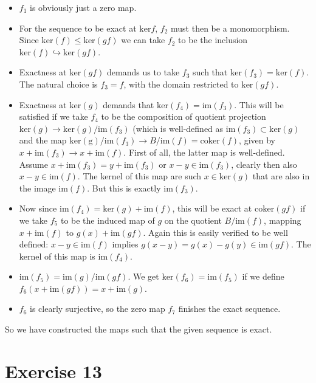 \documentclass{article}
\begin{document}
\begin{itemize}
\item $f_1$ is obviously just a zero map. 
\item For the sequence to be exact at $\mathrm{ker} f$, $f_2$ must then be a monomorphism. 
Since $\mathrm{ker}(f) \leq \mathrm{ker}(gf)$ we can take $f_2$ to be the inclusion $\mathrm{ker}(f) \hookrightarrow \mathrm{ker}(gf)$. 
\item Exactness at $\mathrm{ker}(gf)$ demands us to take $f_3$ such that $\mathrm{ker}(f_3) = \mathrm{ker}(f)$. The natural choice is $f_3=f$, with the domain restricted to $\mathrm{ker}(gf)$.
\item Exactness at $\mathrm{ker}(g)$ demands that $\mathrm{ker}(f_4) = \mathrm{im}(f_3)$. This will be satisfied if we take $f_4$ to be the composition of quotient projection $\mathrm{ker}(g) \to \mathrm{ker}(g)/\mathrm{im}(f_3)$ (which is well-defined as $\mathrm{im}(f_3) \subset \mathrm{ker}(g)$ and the map $\mathrm{ker(g)}/\mathrm{im}(f_3) \to B/\mathrm{im}(f) = \mathrm{coker}(f)$, given by $x + \mathrm{im}(f_3) \to x + \mathrm{im}(f)$.
First of all, the latter map is well-defined. Assume $x+\mathrm{im}(f_3) = y+\mathrm{im}(f_3)$ or $x-y \in \mathrm{im}(f_3)$, clearly then also $x-y \in \mathrm{im}(f)$. The kernel of this map are such $x \in \mathrm{ker}(g)$ that are also in the image $\mathrm{im}(f)$. But this is exactly $\mathrm{im}(f_3)$.
\item Now since $\mathrm{im}(f_4) = \mathrm{ker}(g) + \mathrm{im}(f)$, this will be exact at $\mathrm{coker}(gf)$ if we take $f_5$ to be the induced map of $g$ on the quotient $B/\mathrm{im}(f)$, mapping $x+\mathrm{im}(f)$ to $g(x)+\mathrm{im}(gf)$. Again this is easily verified to be well defined: $x-y \in \mathrm{im}(f)$ implies $g(x-y) = g(x)-g(y) \in \mathrm{im}(gf)$. The kernel of this map is $\mathrm{im}(f_4)$.
\item $\mathrm{im}(f_5) = \mathrm{im}(g) / \mathrm{im}(gf)$. We get $\mathrm{ker}(f_6) = \mathrm{im}(f_5)$ if we define $f_6(x + \mathrm{im}(gf)) = x + \mathrm{im}(g)$.
\item $f_6$ is clearly surjective, so the zero map $f_7$ finishes the exact sequence.
\end{itemize}

So we have constructed the maps such that the given sequence is exact.
\newpage
\section*{Exercise 13}
\end{document}
